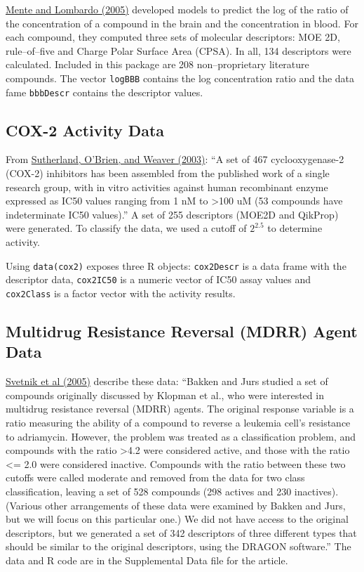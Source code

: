 \documentclass[12pt]{article}
\begin{document}
\href{http://www.springerlink.com/content/72j377175n536768/?p=f546488cc8fa4ec7a3d4911eb20adb3c&pi=0} {Mente and Lombardo (2005)} developed models to predict the log of the ratio of the concentration of a compound in the brain and the concentration in blood. For each compound, they computed three sets of molecular descriptors: MOE 2D, rule--of--five and Charge Polar Surface Area (CPSA). In all, 134 descriptors were calculated.  Included in this package are 208 non--proprietary literature compounds. The vector \texttt{logBBB} contains the log concentration ratio and the data fame \texttt{bbbDescr} contains the descriptor values.

\subsection{COX-2 Activity Data}

From  \href{http://pubs.acs.org/cgi-bin/abstract.cgi/jmcmar/2004/47/i22/abs/jm0497141.html}{Sutherland, O'Brien, and Weaver (2003)}: ``A set of 467 cyclooxygenase-2 (COX-2) inhibitors has been assembled from the published work of a single research group, with in vitro activities against human recombinant enzyme expressed as IC50 values ranging from 1 nM to >100 uM (53 compounds have indeterminate IC50
values).'' A set of 255 descriptors (MOE2D and QikProp) were generated. To classify the data, we used a cutoff of $2^{2.5}$ to determine activity.

Using \texttt{data(cox2)} exposes three R objects: \texttt{cox2Descr} is a data frame with the descriptor data, \texttt{cox2IC50} is a numeric vector of IC50 assay values and \texttt{cox2Class} is a factor vector with the activity results.

\subsection{Multidrug Resistance Reversal (MDRR) Agent Data}

\href{http://pubs.acs.org/cgi-bin/abstract.cgi/jcisd8/2005/45/i03/abs/ci0500379.html}{Svetnik et al (2005)} describe these data: ``Bakken and Jurs studied a set of compounds originally discussed by Klopman et al., who were interested in multidrug resistance reversal (MDRR) agents. The original response variable is a ratio measuring the ability of a compound to reverse a leukemia cell's resistance to adriamycin. However, the problem was treated as a classification problem, and compounds with the ratio >4.2 were considered active, and those with the ratio <= 2.0 were considered inactive. Compounds with the ratio between these two cutoffs were called moderate and removed from the data for two class classification, leaving a set of 528 compounds (298 actives and 230 inactives). (Various other arrangements of these data were examined by Bakken and Jurs, but we will focus on this particular one.) We did not have access to the original descriptors, but we generated a set of 342 descriptors of three different types that should be similar to the original descriptors, using the DRAGON software.'' The data and R code are in the Supplemental Data file for the article.
\end{document}
